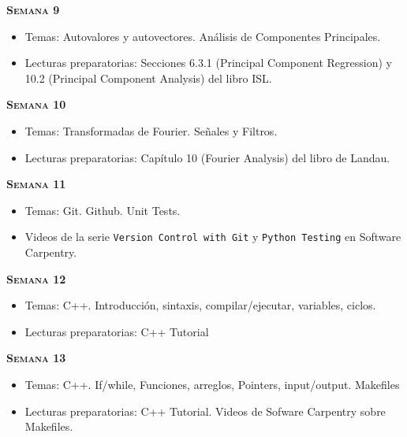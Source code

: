 \documentclass[letterpaper,10pt,onecolumn]{article}
\begin{document}
\noindent\textbf{\textsc{Semana 9}}\\[-0.5cm]
\begin{itemize}
\item Temas: Autovalores y autovectores. 
An\'alisis de Componentes Principales. \\[-0.6cm]
\item Lecturas preparatorias: Secciones 6.3.1 (Principal Component
  Regression) y 10.2 (Principal Component Analysis) del libro ISL.\\[-0.6cm]
\end{itemize}

\noindent\textbf{\textsc{Semana 10}}\\[-0.5cm]
\begin{itemize}
\item Temas: Transformadas de Fourier. Se\~nales y Filtros. \\[-0.6cm]
\item Lecturas preparatorias: Cap\'itulo 10 (Fourier Analysis) del
  libro de Landau.\\[-0.6cm] 
\end{itemize}

\noindent\textbf{\textsc{Semana 11}}\\[-0.5cm]
\begin{itemize}
\item Temas: Git. Github. Unit Tests. \\[-0.6cm]
\item Videos de la serie \texttt{Version Control with Git} y
  \texttt{Python Testing}  en Software Carpentry.\\[-0.6cm]    
\end{itemize}

\noindent\textbf{\textsc{Semana 12}}\\[-0.5cm]
\begin{itemize}
\item Temas: C++. Introducción, sintaxis, compilar/ejecutar,
variables, ciclos. \\[-0.6cm]
\item Lecturas preparatorias: C++ Tutorial\\[-0.6cm]
\end{itemize}


\noindent\textbf{\textsc{Semana 13}}\\[-0.5cm]
\begin{itemize}
\item Temas: C++. If/while, Funciones, arreglos, Pointers, input/output. Makefiles \\[-0.6cm]
\item Lecturas preparatorias: C++ Tutorial. Videos de Sofware
  Carpentry sobre Makefiles.\\[-0.6cm]  
\end{itemize}
\end{document}
